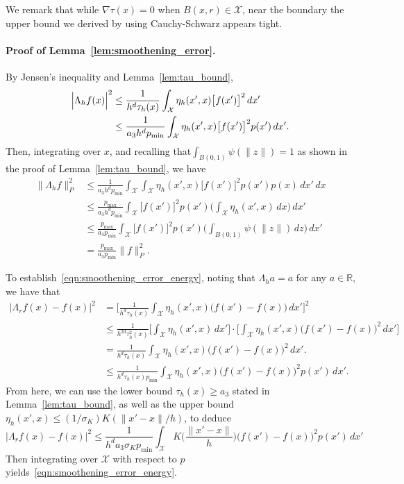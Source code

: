 \documentclass[twoside]{article}
\newcommand{\Reals}{\mathbb{R}}
\newcommand{\1}{\mathbf{1}}
\newcommand{\Xset}{\mathcal{X}}
\theoremstyle{definition}
\theoremstyle{remark}
\begin{document}
We remark that while $\nabla\tau(x) = 0$ when $B(x,r) \in \Xset$, near the boundary the upper bound we derived by using Cauchy-Schwarz appears tight. 

\paragraph{Proof of Lemma~\ref{lem:smoothening_error}.}
By Jensen's inequality and Lemma~\ref{lem:tau_bound},
\begin{align*}
\Bigl|\Lambda_hf(x)\Bigr|^2 & \leq \frac{1}{h^d\tau_h(x)}\int_{\Xset} \eta_h(x',x) \bigl[f(x')\bigr]^2 \,dx' \\
& \leq \frac{1}{a_3 h^dp_{\min}}\int_{\Xset} \eta_h(x',x) \bigl[f(x')\bigr]^2 p(x') \,dx'.
\end{align*}
Then, integrating over $x$, and recalling that$\int_{B(0,1)} \psi(\|z\|) = 1$ as shown in the proof of Lemma~\ref{lem:tau_bound}, we have
\begin{align*}
\bigl\|\Lambda_hf\bigr\|_{P}^2 & \leq \frac{1}{a_3h^d p_{\min}} \int_{\Xset} \int_{\Xset} \eta_h(x',x) \bigl[f(x')\bigr]^2 p(x') p(x) \,dx' \,dx \\ 
& \leq \frac{p_{\max}}{a_3h^dp_{\min}} \int_{\Xset} \bigl[f(x')\bigr]^2 p(x') \biggl(\int_{\Xset} \eta_h(x',x) \,dx\biggr) \,dx' \\
& \leq \frac{p_{\max}}{a_3p_{\min}} \int_{\Xset} \bigl[f(x')\bigr]^2 p(x') \biggl(\int_{B(0,1)} \psi(\|z\|) \,dz\biggr) \,dx' \\
& = \frac{p_{\max}}{a_3p_{\min}} \|f\|_{P}^2.
\end{align*}

To establish~\eqref{eqn:smoothening_error_energy}, noting that $\Lambda_ha = a$ for any $a \in \Reals$, we have that
\begin{align*}
\bigl|\Lambda_rf(x) - f(x)\bigr|^2 & = \biggl[\frac{1}{h^d\tau_h(x)} \int_{\Xset} \eta_h(x',x) \bigl(f(x') - f(x)\bigr) \,dx'\biggr]^2 \\
& \leq \frac{1}{h^{2d} \tau_h^2(x)} \biggl[\int_{\Xset} \eta_h(x',x) \,dx'\biggr] \cdot \biggl[\int_{\Xset} \eta_h(x',x) \bigl(f(x') - f(x)\bigr)^2 \,dx'\biggr] \\
& = \frac{1}{h^d \tau_h(x)} \int_{\Xset} \eta_h(x',x) \bigl(f(x') - f(x)\bigr)^2 \,dx'. \\
& \leq \frac{1}{h^d \tau_h(x) p_{\min}} \int_{\Xset} \eta_h(x',x) \bigl(f(x') - f(x)\bigr)^2 p(x') \,dx'.
\end{align*}
From here, we can use the lower bound $\tau_h(x) \geq a_3$ stated in Lemma~\ref{lem:tau_bound}, as well as the upper bound $\eta_h(x',x) \leq (1/\sigma_K) K(\|x' - x\|/h)$, to deduce
\begin{equation*}
\bigl|\Lambda_rf(x) - f(x)\bigr|^2 \leq \frac{1}{h^{d} a_3 \sigma_K p_{\min}} \int_{\Xset} K\biggl(\frac{\|x' - x\|}{h}\biggr) \bigl(f(x') - f(x)\bigr)^2 p(x') \,dx'
\end{equation*}
Then integrating over $\Xset$ with respect to $p$ yields~\eqref{eqn:smoothening_error_energy}.
\end{document}
